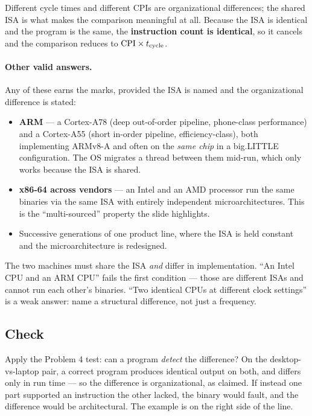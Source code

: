 Different cycle times and different CPIs are organizational differences; the
shared ISA is what makes the comparison meaningful at all. Because the ISA is
identical and the program is the same, the \textbf{instruction count is
identical}, so it cancels and the comparison reduces to
$\mathrm{CPI} \times t_{\mathrm{cycle}}$.

\paragraph{Other valid answers.}
Any of these earns the marks, provided the ISA is named and the organizational
difference is stated:

\begin{itemize}
  \item \textbf{ARM} — a Cortex-A78 (deep out-of-order pipeline, phone-class
    performance) and a Cortex-A55 (short in-order pipeline, efficiency-class),
    both implementing ARMv8-A and often on the \emph{same chip} in a
    big.LITTLE configuration. The OS migrates a thread between them mid-run,
    which only works because the ISA is shared.
  \item \textbf{x86-64 across vendors} — an Intel and an AMD processor run the
    same binaries via the same ISA with entirely independent microarchitectures.
    This is the ``multi-sourced'' property the slide highlights.
  \item Successive generations of one product line, where the ISA is held
    constant and the microarchitecture is redesigned.
\end{itemize}

\begin{trap}
The two machines must share the ISA \emph{and} differ in implementation. ``An
Intel CPU and an ARM CPU'' fails the first condition — those are different ISAs
and cannot run each other's binaries. ``Two identical CPUs at different clock
settings'' is a weak answer: name a structural difference, not just a frequency.
\end{trap}

\subsection*{Check}

Apply the Problem 4 test: can a program \emph{detect} the difference? On the
desktop-vs-laptop pair, a correct program produces identical output on both, and
differs only in run time — so the difference is organizational, as claimed. If
instead one part supported an instruction the other lacked, the binary would
fault, and the difference would be architectural. The example is on the right
side of the line.

